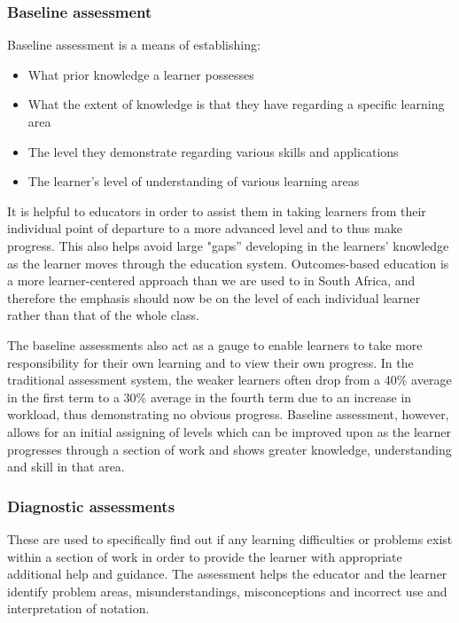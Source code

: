 \subsubsection{Baseline assessment}
Baseline assessment is a means of establishing:
\begin{itemize}[noitemsep]
\item What prior knowledge a learner possesses 
\item What the extent of knowledge is that they have regarding a specific learning area
\item The level they demonstrate regarding various skills and applications
\item The learner’s level of understanding of various learning areas
\end{itemize}
It is helpful to educators in order to assist them in taking learners from their individual point of departure to a more advanced level and to thus make progress. This also helps avoid large "gaps” developing in the learners’ knowledge as the learner moves through the education system. Outcomes-based education is a more learner-centered approach than we are used to in South Africa, and therefore the emphasis should now be on the level of each individual learner rather than that of the whole class. \par 

The baseline assessments also act as a gauge to enable learners to take more responsibility for their own learning and to view their own progress. In the traditional assessment system, the weaker learners often drop from a 40\% average in the first term to a 30\% average in the fourth term due to an increase in workload, thus demonstrating no obvious progress. Baseline assessment, however, allows for an initial assigning of levels which can be improved upon as the learner progresses through a section of work and shows greater knowledge, understanding and skill in that area.

\subsubsection{Diagnostic assessments}
These are used to specifically find out if any learning difficulties or problems exist within a section of work in order to provide the learner with appropriate additional help and guidance. The assessment helps the educator and the learner identify problem areas, misunderstandings, misconceptions and incorrect use and interpretation of notation. \par

